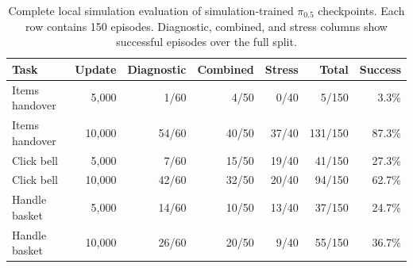\begin{table}[t]
\centering
\caption{Complete local simulation evaluation of simulation-trained $\pi_{0.5}$ checkpoints. Each row contains 150 episodes. Diagnostic, combined, and stress columns show successful episodes over the full split.}
\label{tab:simulation}
\small
\begin{tabular}{lrrrrrr}
\toprule
Task & Update & Diagnostic & Combined & Stress & Total & Success \\
\midrule
Items handover & 5,000 & 1/60 & 4/50 & 0/40 & 5/150 & 3.3\% \\
Items handover & 10,000 & 54/60 & 40/50 & 37/40 & 131/150 & 87.3\% \\
Click bell & 5,000 & 7/60 & 15/50 & 19/40 & 41/150 & 27.3\% \\
Click bell & 10,000 & 42/60 & 32/50 & 20/40 & 94/150 & 62.7\% \\
Handle basket & 5,000 & 14/60 & 10/50 & 13/40 & 37/150 & 24.7\% \\
Handle basket & 10,000 & 26/60 & 20/50 & 9/40 & 55/150 & 36.7\% \\
\bottomrule
\end{tabular}
\end{table}
